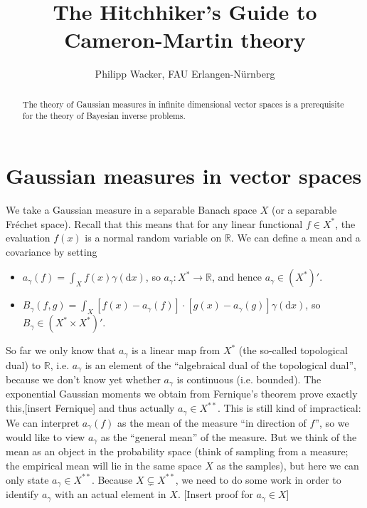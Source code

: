 \documentclass{scrartcl}
\title{The Hitchhiker's Guide to Cameron-Martin theory}
\author{Philipp Wacker, FAU Erlangen-N\"urnberg}
\theoremstyle{definition}
\theoremstyle{remark}
\newcommand{\de}{\mathrm d}
\newcommand{\Frechet}{Fr\'echet }
\newcommand{\R}{\mathbb R}
\newcommand{\ednote}[1]{{\color{red}[#1]}}
\begin{document}
\maketitle
\begin{abstract}
The theory of Gaussian measures in infinite dimensional vector spaces is a prerequisite for the theory of Bayesian inverse problems. 
\end{abstract}
\section{Gaussian measures in vector spaces}

We take a Gaussian measure in a separable Banach space $X$ (or a separable \Frechet space). Recall that this means that for any linear functional $f\in X^*$, the evaluation $f(x)$ is a normal random variable on $\R$. We can define a mean and a covariance by setting
\begin{itemize}
\item $a_\gamma(f) = \int_X f(x)\gamma(\de x)$, so $a_\gamma: X^*\to \R$, and hence $a_\gamma \in (X^*)'$.
\item $B_\gamma(f, g) = \int_X [f(x) - a_\gamma(f)]\cdot [g(x)-a_\gamma(g)]\gamma(\de x)$, so $B_\gamma \in (X^*\times X^*)'$.
\end{itemize}
So far we only know that $a_\gamma$ is a linear map from $X^*$ (the so-called topological dual) to $\R$, i.e. $a_\gamma$ is an element of the ``algebraical dual of the topological dual'', because we don't know yet whether $a_\gamma$ is continuous (i.e. bounded). The exponential Gaussian moments we obtain from Fernique's theorem prove exactly this,\ednote{insert Fernique} and thus actually $a_\gamma \in X^{**}$. This is still kind of impractical: We can interpret $a_\gamma(f)$ as the mean of the measure ``in direction of $f$'', so we would like to view $a_\gamma$ as the ``general mean'' of the measure. But we think of the mean as an object in the probability space (think of sampling from a measure; the empirical mean will lie in the same space $X$ as the samples), but here we can only state $a_\gamma \in X^{**}$. Because $X \subsetneq X^{**}$, we need to do some work in order to identify $a_\gamma$ with an actual element in $X$. \ednote{Insert proof for $a_\gamma \in X$}
\end{document}

